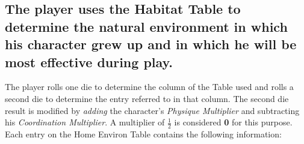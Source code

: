 \subsection[Habitat Table]{The player uses the  Habitat Table to
  determine the 
  natural environment in which his character grew up and in which he
  will be most effective during play.}
\label{sec:habitat-table}

The player rolls one die to determine the column of the Table used and
rolls a second die to determine the entry referred to in that column.
The second die result is modified by \emph{adding} the character's
\emph{Physique Multiplier} and subtracting his \emph{Coordination
  Multiplier}. A multiplier of \textbf{$\frac12$} is considered
\textbf{0} for this purpose. Each entry on the Home Environ Table
contains the following information:

